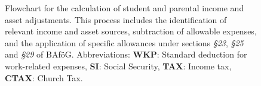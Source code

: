 \begin{landscape}
\begin{figure}[htbp]
{
}
  \caption{Flowchart for the calculation of student and parental income and asset adjustments. This process includes the identification of relevant income and asset sources, subtraction of allowable expenses, and the application of specific allowances under sections \textit{§23}, \textit{§25} and \textit{§29} of BAföG. Abbreviations:
  \textbf{WKP}: Standard deduction for work-related expenses,
  \textbf{SI}: Social Security,
  \textbf{TAX}: Income tax,
  \textbf{CTAX}: Church Tax.}
  \label{fig:pipeline-overview}
\end{figure}
\end{landscape}

